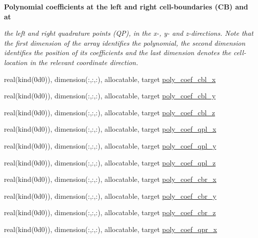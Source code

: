 \begin{Indent}\textbf{ Polynomial coefficients at the left and right cell-\/boundaries (CB) and at}\par
{\em the left and right quadrature points (QP), in the x-\/, y-\/ and z-\/directions. Note that the first dimension of the array identifies the polynomial, the second dimension identifies the position of its coefficients and the last dimension denotes the cell-\/location in the relevant coordinate direction. }\begin{DoxyCompactItemize}
\item 
real(kind(0d0)), dimension(\+:,\+:,\+:), allocatable, target \hyperlink{namespacem__weno_a213b935ef0b013f9e7fd5ebe10b9a4c8}{poly\+\_\+coef\+\_\+cbl\+\_\+x}
\item 
real(kind(0d0)), dimension(\+:,\+:,\+:), allocatable, target \hyperlink{namespacem__weno_aa1d7ef08c1ddba26e1fa12f287c810fa}{poly\+\_\+coef\+\_\+cbl\+\_\+y}
\item 
real(kind(0d0)), dimension(\+:,\+:,\+:), allocatable, target \hyperlink{namespacem__weno_af6c43f5ea0231043e8b5caf439c4719a}{poly\+\_\+coef\+\_\+cbl\+\_\+z}
\item 
real(kind(0d0)), dimension(\+:,\+:,\+:), allocatable, target \hyperlink{namespacem__weno_a3a6911a019190d7e3daa3d6a188785bb}{poly\+\_\+coef\+\_\+qpl\+\_\+x}
\item 
real(kind(0d0)), dimension(\+:,\+:,\+:), allocatable, target \hyperlink{namespacem__weno_abb402003bd3147b520a54b2ea59ca508}{poly\+\_\+coef\+\_\+qpl\+\_\+y}
\item 
real(kind(0d0)), dimension(\+:,\+:,\+:), allocatable, target \hyperlink{namespacem__weno_a223297ebb5fa0e103500e55799c77e36}{poly\+\_\+coef\+\_\+qpl\+\_\+z}
\item 
real(kind(0d0)), dimension(\+:,\+:,\+:), allocatable, target \hyperlink{namespacem__weno_a75f80d77048112859cb929065cb06dc6}{poly\+\_\+coef\+\_\+cbr\+\_\+x}
\item 
real(kind(0d0)), dimension(\+:,\+:,\+:), allocatable, target \hyperlink{namespacem__weno_a4a885bc8ac303d196e88dcace7853223}{poly\+\_\+coef\+\_\+cbr\+\_\+y}
\item 
real(kind(0d0)), dimension(\+:,\+:,\+:), allocatable, target \hyperlink{namespacem__weno_aab74b0a22a637066057e5f69353d33e2}{poly\+\_\+coef\+\_\+cbr\+\_\+z}
\item 
real(kind(0d0)), dimension(\+:,\+:,\+:), allocatable, target \hyperlink{namespacem__weno_acecc3a1f94b6dfafcf8490f29c84f17b}{poly\+\_\+coef\+\_\+qpr\+\_\+x}
\item 

\end{DoxyCompactItemize}
\end{Indent}
